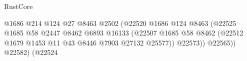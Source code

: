 \begin{lexlean}{RustCore}
\begin{coremodule}
                                                                    @1686
                                                                    @214
                                                                    @124
                                                                    @27
                                                                    @8463
                                                                    @2502
                                                                    (@22520
                                                                      @1686
                                                                      @124
                                                                      @8463
                                                                      (@22525
                                                                        @1685
                                                                        @58
                                                                        @2447
                                                                        @8462
                                                                        @6893
                                                                        @16133
                                                                        (@22507
                                                                          @1685
                                                                          @58
                                                                          @8462
                                                                          (@22512
                                                                            @1679
                                                                            @1453
                                                                            @11
                                                                            @43
                                                                            @8446
                                                                            @7903
                                                                            @27132
                                                                            @25577))
                                                                        @22573))
                                                                    @22565))
                                                                @22582)
                                                              (@22524

\end{coremodule}
\end{lexlean}
